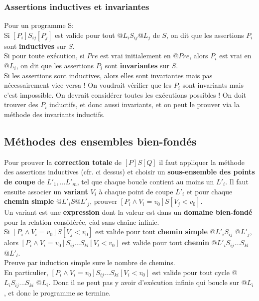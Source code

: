\subsubsection{Assertions inductives et invariantes}
Pour un programme S:\\
Si $[P_i]S_{ij}[P_j]$ est valide pour tout @$L_iS_{ij}$@$L_j$ de $S$, on dit que les assertions $P_i$ sont \textbf{inductives} sur $S$.\\
Si pour toute exécution, si $Pre$ est vrai initialement en @$Pre$, alors $P_i$ est vrai en @$L_i$, on dit que les assertions $P_i$ sont \textbf{invariantes} sur $S$.\\

Si les assertions sont inductives, alors elles sont invariantes mais pas nécessairement vice versa ! On voudrait vérifier que les $P_i$ sont invariants mais c'est impossible. On devrait considérer toutes les exécutions possibles ! On doit trouver des $P_i$ inductifs, et donc aussi invariants, et on peut le prouver via la méthode des invariants inductifs.
\subsection{Méthodes des ensembles bien-fondés}
Pour prouver la \textbf{correction totale} de $[P] S[Q]$ il faut appliquer la méthode des assertions inductives (cfr. ci dessus) et choisir un \textbf{sous-ensemble des points de coupe} de $L'_1,...L'_m$, tel que chaque boucle contient au moins un $L'_i$. Il faut ensuite associer un \textbf{variant} $V_i$ à chaque point de coupe $L'_i$ et pour chaque \textbf{chemin simple} @$L'_i S$@$L'_j$, prouver $[P_i \wedge V_i = v_0] S [V_j < v_0]$.\\
Un variant est une \textbf{expression} dont la valeur est dans un \textbf{domaine bien-fondé} pour la relation considérée, càd sans chaîne infinie.\\

Si $[P_i \wedge V_i = v_0] S [V_j < v_0]$ est  valide pour tout \textbf{chemin simple} @$L'_i S_{ij}$ @$L'_j$,\\
alors $[P_i \wedge V_i = v_0] S_{ij}...S_{kl} [V_l < v_0]$ est valide pour tout \textbf{chemin}  @$L'_i S_{ij}...S_{kl}$ @$L'_l$.\\
Preuve par induction simple sure le nombre de chemins.\\
En particulier, $[P_i \wedge V_i = v_0] S_{ij}...S_{ki} [V_i < v_0]$ est valide pour tout cycle @$L_i S_{ij}...S_{ki}$ @$L_i$. Donc il ne peut pas y avoir d'exécution infinie qui boucle sur @$L_i$, et donc le programme se termine.
